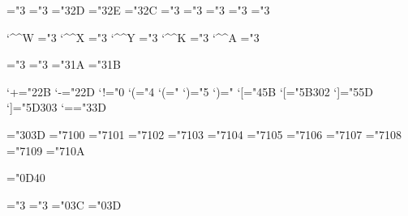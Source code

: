 \mathchardef\nearrow        ="3
\mathchardef\searrow        ="3
\mathchardef\nwarrow        ="3\hexexfam 2D
\mathchardef\swarrow        ="3\hexexfam 2E
\mathchardef\Leftrightarrow ="3\hexexfam 2C
\mathchardef\Leftarrow      ="3
\mathchardef\Rightarrow     ="3
\mathchardef\leftrightarrow ="3 
\mathchardef\leftarrow      ="3 
\mathchardef\rightarrow     ="3

\let\gets =\leftarrow 
\let\to   =\rightarrow  

\mathcode`\^^W              ="3
\mathcode`\^^X              ="3
\mathcode`\^^Y              ="3
\mathcode`\^^K              ="3
\mathcode`\^^A              ="3

\def\uparrow                {\delimiter"3\hexexfam 22378 } 
\def\downarrow              {\delimiter"3\hexexfam 23379 } 
\def\updownarrow            {\delimiter"3\hexexfam 6C33F }
\def\Uparrow                {\delimiter"3\hexexfam 2A37E }
\def\Downarrow              {\delimiter"3\hexexfam 2B37F }
\def\Updownarrow            {\delimiter"3\hexexfam 6D377 }

\mathchardef\leftharpoonup    ="3
\mathchardef\leftharpoondown  ="3
\mathchardef\rightharpoonup   ="3\hexexfam 1A
\mathchardef\rightharpoondown ="3\hexexfam 1B

\mathcode`+="2\hexfmfam 2B
\mathcode`-="2\hexfmfam 2D
\mathcode`!="0
\mathcode`(="4    \delcode`(="
\mathcode`)="5    \delcode`)="
\mathcode`[="4\hexfmfam 5B    \delcode`[="\hexfmfam 5B302
\mathcode`]="5\hexfmfam 5D    \delcode`]="\hexfmfam 5D303
\mathcode`=="3\hexfmfam 3D

\mathchardef\Relbar  ="303D %
\mathchardef\Gamma   ="7100
\mathchardef\Delta   ="7101
\mathchardef\Theta   ="7102
\mathchardef\Lambda  ="7103
\mathchardef\Xi      ="7104
\mathchardef\Pi      ="7105
\mathchardef\Sigma   ="7106
\mathchardef\Upsilon ="7107
\mathchardef\Phi     ="7108
\mathchardef\Psi     ="7109
\mathchardef\Omega   ="710A

\let\varsigma        =\sigma %
\let\varrho          =\rho   %
\mathchardef\aleph   ="0D40

\def\rbrace          {\delimiter"5\hexsmfam 67A09 } \let\}=\rbrace
\def\lbrace          {\delimiter"4\hexsmfam 66A08 } \let\{=\lbrace

\mathchardef\leq     ="3 \let\le=\leq
\mathchardef\geq     ="3 \let\ge=\geq
\mathchardef\Re      ="0\hexsmfam 3C
\mathchardef\Im      ="0\hexsmfam 3D

\def\vert            {\delimiter"\hexsmfam 6A30C }
\def\backslash       {\delimiter"\hexsmfam 6E30F }

\endinput
